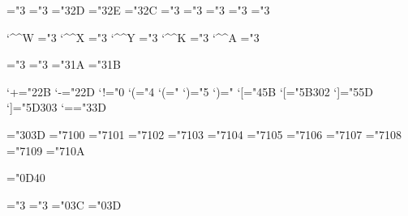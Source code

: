 \mathchardef\nearrow        ="3
\mathchardef\searrow        ="3
\mathchardef\nwarrow        ="3\hexexfam 2D
\mathchardef\swarrow        ="3\hexexfam 2E
\mathchardef\Leftrightarrow ="3\hexexfam 2C
\mathchardef\Leftarrow      ="3
\mathchardef\Rightarrow     ="3
\mathchardef\leftrightarrow ="3 
\mathchardef\leftarrow      ="3 
\mathchardef\rightarrow     ="3

\let\gets =\leftarrow 
\let\to   =\rightarrow  

\mathcode`\^^W              ="3
\mathcode`\^^X              ="3
\mathcode`\^^Y              ="3
\mathcode`\^^K              ="3
\mathcode`\^^A              ="3

\def\uparrow                {\delimiter"3\hexexfam 22378 } 
\def\downarrow              {\delimiter"3\hexexfam 23379 } 
\def\updownarrow            {\delimiter"3\hexexfam 6C33F }
\def\Uparrow                {\delimiter"3\hexexfam 2A37E }
\def\Downarrow              {\delimiter"3\hexexfam 2B37F }
\def\Updownarrow            {\delimiter"3\hexexfam 6D377 }

\mathchardef\leftharpoonup    ="3
\mathchardef\leftharpoondown  ="3
\mathchardef\rightharpoonup   ="3\hexexfam 1A
\mathchardef\rightharpoondown ="3\hexexfam 1B

\mathcode`+="2\hexfmfam 2B
\mathcode`-="2\hexfmfam 2D
\mathcode`!="0
\mathcode`(="4    \delcode`(="
\mathcode`)="5    \delcode`)="
\mathcode`[="4\hexfmfam 5B    \delcode`[="\hexfmfam 5B302
\mathcode`]="5\hexfmfam 5D    \delcode`]="\hexfmfam 5D303
\mathcode`=="3\hexfmfam 3D

\mathchardef\Relbar  ="303D %
\mathchardef\Gamma   ="7100
\mathchardef\Delta   ="7101
\mathchardef\Theta   ="7102
\mathchardef\Lambda  ="7103
\mathchardef\Xi      ="7104
\mathchardef\Pi      ="7105
\mathchardef\Sigma   ="7106
\mathchardef\Upsilon ="7107
\mathchardef\Phi     ="7108
\mathchardef\Psi     ="7109
\mathchardef\Omega   ="710A

\let\varsigma        =\sigma %
\let\varrho          =\rho   %
\mathchardef\aleph   ="0D40

\def\rbrace          {\delimiter"5\hexsmfam 67A09 } \let\}=\rbrace
\def\lbrace          {\delimiter"4\hexsmfam 66A08 } \let\{=\lbrace

\mathchardef\leq     ="3 \let\le=\leq
\mathchardef\geq     ="3 \let\ge=\geq
\mathchardef\Re      ="0\hexsmfam 3C
\mathchardef\Im      ="0\hexsmfam 3D

\def\vert            {\delimiter"\hexsmfam 6A30C }
\def\backslash       {\delimiter"\hexsmfam 6E30F }

\endinput
